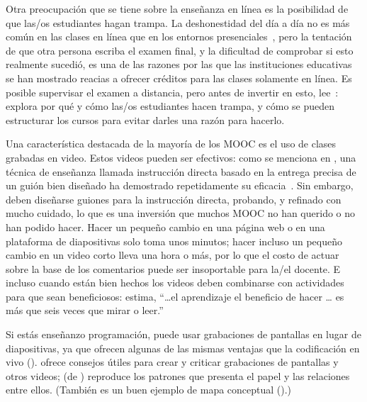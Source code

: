Otra preocupación que se tiene sobre la enseñanza en línea es la posibilidad de que las/os estudiantes hagan trampa.
La deshonestidad del día a día no es más común en las clases en línea que en los entornos presenciales~\cite{Beck2014},
pero la tentación de que otra persona escriba el examen final,
y la dificultad de comprobar si esto realmente sucedió,
es una de las razones por las que las instituciones educativas se han mostrado reacias a ofrecer créditos para las clases solamente en línea.
Es posible supervisar el examen a distancia,
pero antes de invertir en esto,
lee~\cite{Lang2013}:
explora por qué y cómo las/os estudiantes hacen trampa,
y cómo se pueden estructurar los cursos para evitar darles una razón para hacerlo.


Una característica destacada de la mayoría de los MOOC es el uso de clases grabadas en video.
Estos videos pueden ser efectivos:
como se menciona en ,
una técnica de enseñanza llamada instrucción directa
basado en la entrega precisa de un guión bien diseñado ha demostrado repetidamente su eficacia~\cite{Stoc2018}.
Sin embargo,
deben diseñarse guiones para la instrucción directa,
probando,
y refinado con mucho cuidado,
lo que es una inversión que muchos MOOC no han querido o no han podido hacer.
Hacer un pequeño cambio en una página web o en una plataforma de diapositivas solo toma unos minutos;
hacer incluso un pequeño cambio en un video corto lleva una hora o más,
por lo que el costo de actuar sobre la base de los comentarios puede ser insoportable para la/el docente.
E incluso cuando están bien hechos
los videos deben combinarse con actividades para que sean beneficiosos:
\cite{Koed2015} estima,
``{\ldots}el aprendizaje el beneficio de hacer {\ldots} es
más que seis veces que mirar o leer.''

Si estás enseñanzo programación,
puede usar grabaciones de pantallas en lugar de diapositivas,
ya que ofrecen algunas de las mismas ventajas que la codificación en vivo ().
\cite{Chen2009} ofrece consejos útiles para crear y criticar grabaciones de pantallas y otros videos;
 (de \cite{Chen2009}) reproduce los patrones que presenta el papel
y las relaciones entre ellos.
(También es un buen ejemplo de mapa conceptual ().)


